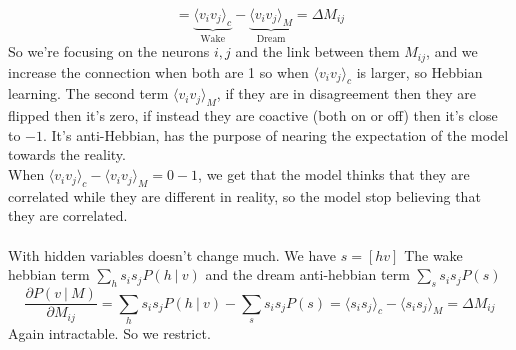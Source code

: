 \documentclass[10pt]{report}
\begin{document}
$$=\underset{\text{Wake}}{\underbrace{\langle v_iv_j\rangle_c}} - \underset{\text{Dream}}{\underbrace{\langle v_iv_j\rangle_M}} = \Delta M_{ij}$$
So we're focusing on the neurons $i, j$ and the link between them $M_{ij}$, and we increase the connection when both are 1 so when $\langle v_iv_j\rangle_c$ is larger, so Hebbian learning. The second term $\langle v_iv_j\rangle_M$, if they are in disagreement then they are flipped then it's zero, if instead they are coactive (both on or off) then it's close to $-1$. It's anti-Hebbian, has the purpose of nearing the expectation of the model towards the reality.\\
When $\langle v_iv_j\rangle_c - \langle v_iv_j\rangle_M = 0-1$, we get that the model thinks that they are correlated while they are different in reality, so the model stop believing that they are correlated.\\\\
With hidden variables doesn't change much. We have $s=[hv]$
The wake hebbian term $\sum_h s_is_jP(h\:|\:v)$ and the dream anti-hebbian term $\sum_ss_is_jP(s)$
$$\frac{\partial P(v\:|\:M)}{\partial M_{ij}} = \sum_h s_is_jP(h\:|\:v) - \sum_ss_is_jP(s) = \langle s_is_j\rangle_c - \langle s_is_j\rangle_M = \Delta M_{ij}$$
Again intractable. So we restrict.
\end{document}
